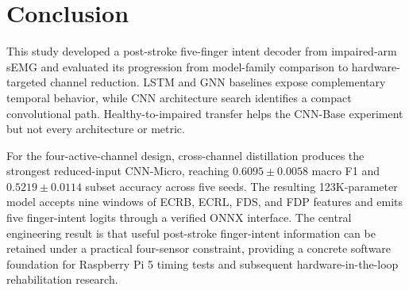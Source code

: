 \section{Conclusion}

This study developed a post-stroke five-finger intent decoder from impaired-arm sEMG and evaluated its progression from model-family comparison to hardware-targeted channel reduction. LSTM and GNN baselines expose complementary temporal behavior, while CNN architecture search identifies a compact convolutional path. Healthy-to-impaired transfer helps the CNN-Base experiment but not every architecture or metric.

For the four-active-channel design, cross-channel distillation produces the strongest reduced-input CNN-Micro, reaching $0.6095\pm0.0058$ macro F1 and $0.5219\pm0.0114$ subset accuracy across five seeds. The resulting 123K-parameter model accepts nine windows of ECRB, ECRL, FDS, and FDP features and emits five finger-intent logits through a verified ONNX interface. The central engineering result is that useful post-stroke finger-intent information can be retained under a practical four-sensor constraint, providing a concrete software foundation for Raspberry Pi 5 timing tests and subsequent hardware-in-the-loop rehabilitation research.
